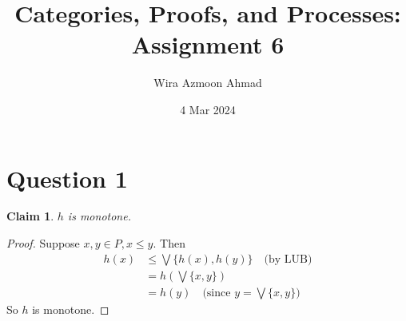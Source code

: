 \documentclass[11pt]{article} %
\title{Categories, Proofs, and Processes: \\Assignment 6}
\author{Wira Azmoon Ahmad}
\date{4 Mar 2024}
\newtheorem{claim}[theorem]{Claim}
\theoremstyle{definition}
\theoremstyle{definition}
\theoremstyle{definition}
\begin{document}
%
\maketitle





\section*{Question 1}
\addtocounter{section}{1}
\begin{claim}
    $h$ is monotone.
\end{claim}
\begin{proof}
Suppose $x,y\in P, x\leq y$. Then
\begin{equation}
\begin{aligned}
    h(x) &\leq \bigvee \{h(x),h(y)\}\quad\text{(by LUB)}\\
    &= h\left(\bigvee \{x,y\}\right)\\
    &= h(y) \quad\text{(since $y = \bigvee \{x,y\}$)}
\end{aligned}
\end{equation}
So $h$ is monotone.
\end{proof}
\end{document}
